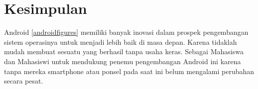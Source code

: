 	\section{Kesimpulan}
		Android \ref{androidfigures} memiliki banyak inovasi dalam prospek pengembangan sistem operasinya untuk menjadi lebih baik
		di masa depan. Karena tidaklah mudah membuat sesuatu yang berhasil tanpa usaha keras. Sebagai Mahasiswa
		dan Mahasiswi untuk mendukung penemu pengembangan Android ini karena tanpa mereka smartphone atau ponsel
		pada saat ini belum mengalami perubahan secara pesat.